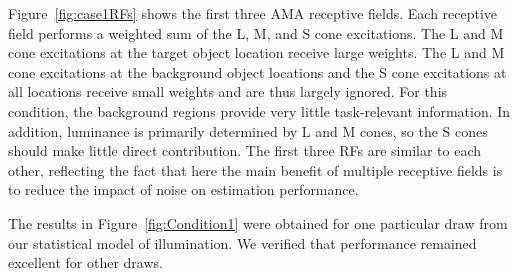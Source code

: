 \documentclass{jov}
\begin{document}
Figure~\ref{fig:case1RFs} shows the first three AMA receptive fields.
Each receptive field performs a weighted sum of the L, M, and S cone excitations.
The L and M cone excitations at the target object location receive large weights.
The L and M cone excitations at the background object locations and the S cone excitations at all locations receive small weights and are thus largely ignored. 
For this condition, the background regions provide very little task-relevant information. 
In addition, luminance is primarily determined by L and M cones, so the S cones should make little
direct contribution.
The first three RFs are similar to each other, reflecting the fact that here the main benefit
of multiple receptive fields is to reduce the impact of noise on estimation performance.

The results in Figure~\ref{fig:Condition1} were obtained for one particular draw from our statistical model of illumination.
We verified that performance remained excellent for other draws.
\end{document}
